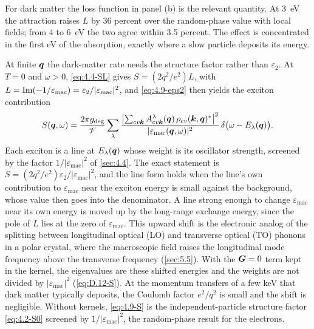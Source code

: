 For dark matter the loss function in panel (b) is the relevant quantity. At \SI{3}{eV} the attraction raises $L$ by 36 percent over the random-phase value with local fields; from 4 to \SI{6}{eV} the two agree within 3.5 percent. The effect is concentrated in the first eV of the absorption, exactly where a slow particle deposits its energy.

At finite $\bm{q}$ the dark-matter rate needs the structure factor rather than $\varepsilon_2$. At $T = 0$ and $\omega > 0$, \cref{eq:4.4-SL} gives $S = (2q^2/e^2)L$, with $L = \operatorname{Im}(-1/\varepsilon_{\mathrm{mac}}) = \varepsilon_2/|\varepsilon_{\mathrm{mac}}|^2$, and \cref{eq:4.9-eps2} then yields the exciton contribution
\begin{equation}
  S(\bm{q},\omega) = \frac{2\pi g_{\mathrm{deg}}}{\mathscr{V}}\sum_\lambda\frac{\bigl|\sum_{cv\bm{k}}A^\lambda_{cv\bm{k}}(\bm{q})\,\rho_{cv}(\bm{k},\bm{q})^*\bigr|^2}{|\varepsilon_{\mathrm{mac}}(\bm{q},\omega)|^2}\,\delta\bigl(\omega - E_\lambda(\bm{q})\bigr) .
  \label{eq:4.9-S}
\end{equation}
Each exciton is a line at $E_\lambda(\bm{q})$ whose weight is its oscillator strength, screened by the factor $1/|\varepsilon_{\mathrm{mac}}|^2$ of \cref{sec:4.4}. The exact statement is $S = (2q^2/e^2)\varepsilon_2/|\varepsilon_{\mathrm{mac}}|^2$, and the line form holds when the line's own contribution to $\varepsilon_{\mathrm{mac}}$ near the exciton energy is small against the background, whose value then goes into the denominator. A line strong enough to change $\varepsilon_{\mathrm{mac}}$ near its own energy is moved up by the long-range exchange energy, since the pole of $L$ lies at the zero of $\varepsilon_{\mathrm{mac}}$. This upward shift is the electronic analog of the splitting between longitudinal optical (LO) and transverse optical (TO) phonons in a polar crystal, where the macroscopic field raises the longitudinal mode frequency above the transverse frequency (\cref{sec:5.5}). With the $\bm{G} = 0$ term kept in the kernel, the eigenvalues are these shifted energies and the weights are not divided by $|\varepsilon_{\mathrm{mac}}|^2$ (\cref{eq:D.12-S}). At the momentum transfers of a few keV that dark matter typically deposits, the Coulomb factor $e^2/q^2$ is small and the shift is negligible. Without kernels, \cref{eq:4.9-S} is the independent-particle structure factor \cref{eq:4.2-S0} screened by $1/|\varepsilon_{\mathrm{mac}}|^2$, the random-phase result for the electrons.

